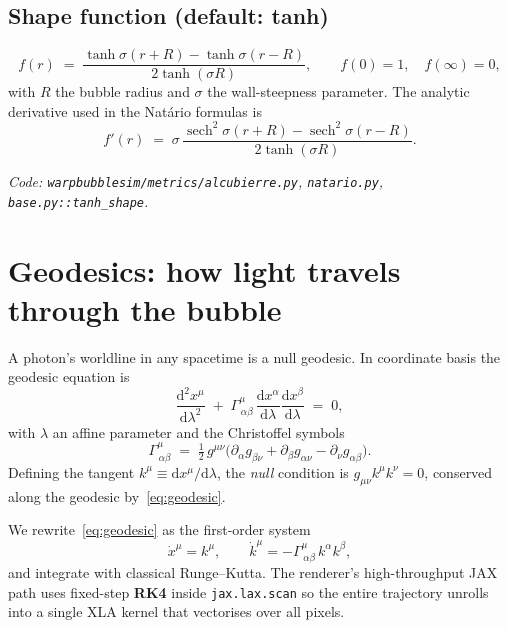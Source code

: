 \documentclass[11pt]{article}
\newcommand{\diff}{\mathrm{d}}
\newcommand{\ginv}{g^{\mu\nu}}
\newcommand{\Christ}[3]{\Gamma^{#1}_{\,#2 #3}}
\begin{document}
\subsection*{Shape function (default: tanh)}
\begin{equation}
f(r) \;=\; \frac{\tanh\sigma(r+R) - \tanh\sigma(r-R)}{2\tanh(\sigma R)},
\qquad f(0)=1,\quad f(\infty)=0,
\label{eq:tanh-shape}
\end{equation}
with $R$ the bubble radius and $\sigma$ the wall-steepness parameter.  The
analytic derivative used in the Natário formulas is
\begin{equation}
f'(r) \;=\; \sigma\,\frac{\operatorname{sech}^2\sigma(r+R) - \operatorname{sech}^2\sigma(r-R)}{2\tanh(\sigma R)}.
\label{eq:tanh-shape-deriv}
\end{equation}

\smallskip
\noindent\emph{Code: \texttt{warpbubblesim/metrics/alcubierre.py}, \texttt{natario.py}, \texttt{base.py::tanh\_shape}.}

\section{Geodesics: how light travels through the bubble}

A photon's worldline in any spacetime is a null geodesic.  In coordinate
basis the geodesic equation is
\begin{equation}
\frac{\diff^2 x^\mu}{\diff\lambda^2} \;+\; \Christ{\mu}{\alpha}{\beta}\,\frac{\diff x^\alpha}{\diff\lambda}\frac{\diff x^\beta}{\diff\lambda} \;=\; 0,
\label{eq:geodesic}
\end{equation}
with $\lambda$ an affine parameter and the Christoffel symbols
\begin{equation}
\Christ{\mu}{\alpha}{\beta} \;=\; \tfrac12\,\ginv\bigl(\partial_\alpha g_{\beta\nu} + \partial_\beta g_{\alpha\nu} - \partial_\nu g_{\alpha\beta}\bigr).
\label{eq:christoffel}
\end{equation}
Defining the tangent $k^\mu \equiv \diff x^\mu/\diff\lambda$, the
\emph{null} condition is $g_{\mu\nu}k^\mu k^\nu = 0$, conserved along the
geodesic by~\eqref{eq:geodesic}.

We rewrite~\eqref{eq:geodesic} as the first-order system
\begin{equation}
\boxed{\quad
\dot x^\mu = k^\mu, \qquad
\dot k^\mu = -\Christ{\mu}{\alpha}{\beta}\,k^\alpha k^\beta,
\quad}
\label{eq:rhs}
\end{equation}
and integrate with classical Runge--Kutta.  The renderer's high-throughput
JAX path uses fixed-step \textbf{RK4} inside \texttt{jax.lax.scan} so the
entire trajectory unrolls into a single XLA kernel that vectorises over all
pixels.
\end{document}
